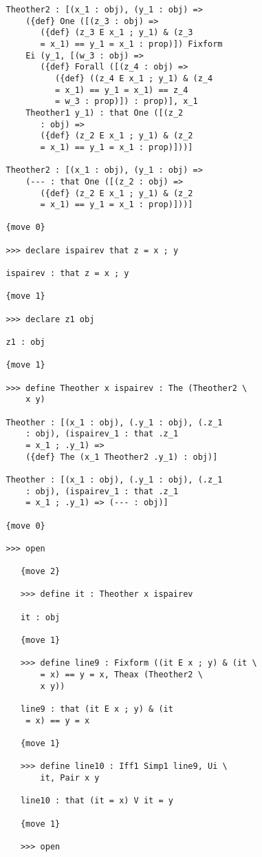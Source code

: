 \documentclass[12pt]{article}
\begin{document}
\begin{verbatim}
   Theother2 : [(x_1 : obj), (y_1 : obj) => 
       ({def} One ([(z_3 : obj) => 
          ({def} (z_3 E x_1 ; y_1) & (z_3 
          = x_1) == y_1 = x_1 : prop)]) Fixform 
       Ei (y_1, [(w_3 : obj) => 
          ({def} Forall ([(z_4 : obj) => 
             ({def} ((z_4 E x_1 ; y_1) & (z_4 
             = x_1) == y_1 = x_1) == z_4 
             = w_3 : prop)]) : prop)], x_1 
       Theother1 y_1) : that One ([(z_2 
          : obj) => 
          ({def} (z_2 E x_1 ; y_1) & (z_2 
          = x_1) == y_1 = x_1 : prop)]))]

   Theother2 : [(x_1 : obj), (y_1 : obj) => 
       (--- : that One ([(z_2 : obj) => 
          ({def} (z_2 E x_1 ; y_1) & (z_2 
          = x_1) == y_1 = x_1 : prop)]))]

   {move 0}

   >>> declare ispairev that z = x ; y

   ispairev : that z = x ; y

   {move 1}

   >>> declare z1 obj

   z1 : obj

   {move 1}

   >>> define Theother x ispairev : The (Theother2 \
       x y)

   Theother : [(x_1 : obj), (.y_1 : obj), (.z_1 
       : obj), (ispairev_1 : that .z_1 
       = x_1 ; .y_1) => 
       ({def} The (x_1 Theother2 .y_1) : obj)]

   Theother : [(x_1 : obj), (.y_1 : obj), (.z_1 
       : obj), (ispairev_1 : that .z_1 
       = x_1 ; .y_1) => (--- : obj)]

   {move 0}

   >>> open

      {move 2}

      >>> define it : Theother x ispairev

      it : obj

      {move 1}

      >>> define line9 : Fixform ((it E x ; y) & (it \
          = x) == y = x, Theax (Theother2 \
          x y))

      line9 : that (it E x ; y) & (it 
       = x) == y = x

      {move 1}

      >>> define line10 : Iff1 Simp1 line9, Ui \
          it, Pair x y

      line10 : that (it = x) V it = y

      {move 1}

      >>> open


\end{verbatim}
\end{document}
